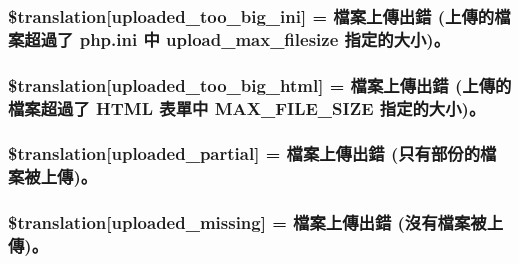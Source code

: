 \subsubsection[{\$translation}]{\setlength{\rightskip}{0pt plus 5cm}\$translation\mbox{[}\textquotesingle{}uploaded\+\_\+too\+\_\+big\+\_\+ini\textquotesingle{}\mbox{]} = \textquotesingle{}檔案上傳出錯 (上傳的檔案超過了 php.\+ini 中 upload\+\_\+max\+\_\+filesize 指定的大小)。\textquotesingle{}}\label{class_8upload_8zh___t_w_8php_a6a08dcd0d3651fdd098568f6b2f0a42c}
\hypertarget{class_8upload_8zh___t_w_8php_a623d5b8b92169f57d7e43458aa911cbb}{}
\subsubsection[{\$translation}]{\setlength{\rightskip}{0pt plus 5cm}\$translation\mbox{[}\textquotesingle{}uploaded\+\_\+too\+\_\+big\+\_\+html\textquotesingle{}\mbox{]} = \textquotesingle{}檔案上傳出錯 (上傳的檔案超過了 H\+T\+M\+L 表單中 M\+A\+X\+\_\+\+F\+I\+L\+E\+\_\+\+S\+I\+Z\+E 指定的大小)。\textquotesingle{}}\label{class_8upload_8zh___t_w_8php_a623d5b8b92169f57d7e43458aa911cbb}
\hypertarget{class_8upload_8zh___t_w_8php_a967c17da21b0a2d3bd65cca3a9ca0ea8}{}
\subsubsection[{\$translation}]{\setlength{\rightskip}{0pt plus 5cm}\$translation\mbox{[}\textquotesingle{}uploaded\+\_\+partial\textquotesingle{}\mbox{]} = \textquotesingle{}檔案上傳出錯 (只有部份的檔案被上傳)。\textquotesingle{}}\label{class_8upload_8zh___t_w_8php_a967c17da21b0a2d3bd65cca3a9ca0ea8}
\hypertarget{class_8upload_8zh___t_w_8php_a0cce433260be65f1f35853a6b4b8952b}{}
\subsubsection[{\$translation}]{\setlength{\rightskip}{0pt plus 5cm}\$translation\mbox{[}\textquotesingle{}uploaded\+\_\+missing\textquotesingle{}\mbox{]} = \textquotesingle{}檔案上傳出錯 (沒有檔案被上傳)。\textquotesingle{}}\label{class_8upload_8zh___t_w_8php_a0cce433260be65f1f35853a6b4b8952b}
\hypertarget{class_8upload_8zh___t_w_8php_ae3cdc68fe248399f77246c91b0555341}{}
